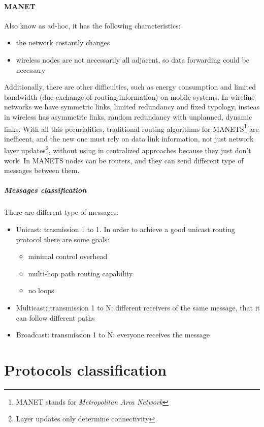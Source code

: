 \paragraph*{MANET} Also know as ad-hoc, it has the following characteristics:
\begin{itemize}
\item the network costantly changes
\item wireless nodes are not necessarily all adjacent, so data forwarding
  could be necessary
\end{itemize}
Additionally, there are other difficulties, such as energy consumption and
limited bandwidth (due exchange of routing information) on mobile systems. In
wireline networks we have symmetric links, limited redundancy and fixed
typology, insteas in wireless has asymmetric links, random redundancy with
unplanned, dynamic links. With all this pecurialities, traditional routing
algorithms for MANETS\footnote{MANET stands for \textit{Metropolitan Area
    Network}} are inefficent, and the new one must rely on data link
information, not just network layer updates\footnote{Layer updates only
  determine connectivity}, without using in centralized approaches because they
just don't work. In MANETS nodes can be routers, and they can send different
type of messages between them.
\subparagraph*{Messages classification} There are different type of messages:
\begin{itemize}
\item Unicast: trasmission 1 to 1. In order to achieve a good unicast routing
  protocol there are some goals:
  \begin{itemize}
  \item minimal control overhead
  \item multi-hop path routing capability
  \item no loops
  \end{itemize}
\item Multicast: transmission 1 to N: different receivers of the same message,
  that it can follow different paths
\item Broadcast: transmission 1 to N: everyone receives the message
\end{itemize}

\section{Protocols classification}
